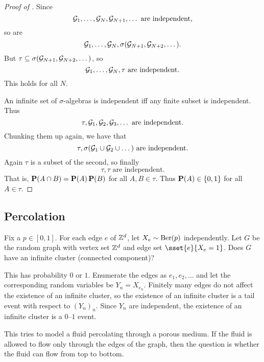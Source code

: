\begin{proof}[Proof of ]
    Since \[
        \mcG_1, \dots, \mcG_N, \mcG_{N+1}, \dots
        \text{ are independent,}
    \] so are \[
        \mcG_1, \dots, \mcG_N, \sigma(\mcG_{N+1}, \mcG_{N+2}, \dots).
    \]
    But $\tau \subseteq \sigma(\mcG_{N+1}, \mcG_{N+2}, \dots)$, so \[
        \mcG_1, \dots, \mcG_N, \tau \text{ are independent.}
    \] This holds for all $N$.

    An infinite set of $\sigma$-algebras is independent iff any finite
    subset is independent.
    Thus \[
        \tau, \mcG_1, \mcG_2, \mcG_3, \dots \text{ are independent.}
    \]
    Chunking them up again, we have that \[
        \tau, \sigma(\mcG_1 \cup \mcG_2 \cup \dots) \text{ are independent.}
    \]
    Again $\tau$ is a subset of the second, so finally \[
        \tau, \tau \text{ are independent.}
    \]
    That is, $\P(A \cap B) = \P(A) \P(B)$ for all $A, B \in \tau$.
    Thus $\P(A) \in \set{0, 1}$ for all $A \in \tau$.
\end{proof}

\subsection{Percolation} \label{sec:percolation}
Fix a $p \in [0, 1]$.
For each edge $e$ of $\Z^d$, let $X_e \sim \Ber(p)$ independently.
Let $G$ be the random graph with vertex set $\Z^d$ and edge set
$\sset{e}{X_e = 1}$.
Does $G$ have an infinite cluster (connected component)?

This has probability $0$ or $1$.
Enumerate the edges as $e_1, e_2, \dots$ and let the corresponding
random variables be $Y_n = X_{e_n}$.
Finitely many edges do not affect the existence of an infinite cluster,
so the existence of an infinite cluster is a tail event with respect to
$(Y_n)_n$.
Since $Y_n$ are independent, the existence of an infinite cluster is
a $0$--$1$ event.

\begin{remark}
    This tries to model a fluid percolating through a porous medium.
    If the fluid is allowed to flow only through the edges of the graph,
    then the question is whether the fluid can flow from top to bottom.
\end{remark}

